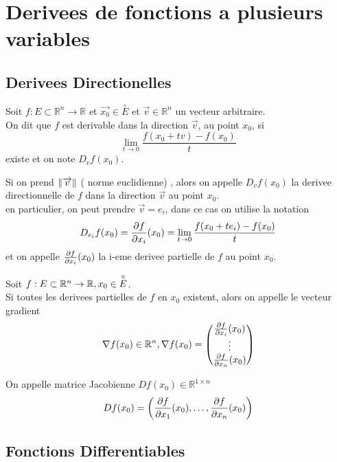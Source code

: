 \documentclass[../main.tex]{subfiles}
\begin{document}
\section{Derivees de fonctions a plusieurs variables}
\subsection{Derivees Directionelles}
\begin{defn}
	Soit $f:E\subset \mathbb{R}^n \to \mathbb{R}$ et $\vec{x_0} \in \overset{\circ}{E}$ et $\vec{v} \in \mathbb{R}^n$ un vecteur arbitraire.\\
	On dit que $f$ est derivable dans la direction $ \vec{v}$, au point $x_0$, si 
	 \[ 
		 \lim_{t \to 0} \frac{f( x_0 + tv) - f( x_0) }{t}
	\]
	existe et on note $ D_v f( x_0) $.
	
\end{defn}
Si on prend $\left\lVert \overrightarrow{v}\right\rVert$ ( norme euclidienne) , alors on appelle $D_vf( x_0) $ la derivee directionnelle de $f$ dans la direction $\vec{v}$ au point $x_0$.\\
en particulier, on peut prendre $\vec{v} = e_i$, dans ce cas on utilise la notation
\[ 
	D_{e_i} f( x_0) = \frac{\partial f}{\partial x_i}( x_0) = \lim_{t \to 0} \frac{f( x_0 + t e_i) - f( x_0)}{t} 
\]
et on appelle $\frac{\partial f}{\partial x_i}( x_0)$ la i-eme derivee partielle de $f$ au point $x_0$.
\begin{defn}[Gradient]
	Soit $f: E \subset \mathbb{R}^n\to \mathbb{R},  x_0 \in \overset{\circ}{E}$.\\
	Si toutes les derivees partielles de $f$ en $x_0$ existent, alors on appelle le vecteur gradient
	\[ 
		\nabla f( x_0) \in \mathbb{R}^n, \nabla f( x_0) = 
		\begin{pmatrix}
			\frac{\partial f}{\partial x_i}( x_0) \\
			\vdots\\
			\frac{\partial f}{\partial x_n}( x_0) 
		\end{pmatrix}
	\]
	
\end{defn}
\begin{defn}
	On appelle matrice Jacobienne $D f( x_0) \in \mathbb{R}^{1\times n}$
	\[ 
		D f( x_0) = \left( \frac{\partial f}{\partial x_1}( x_0) , \ldots, \frac{\partial f}{\partial x_n}( x_0)  \right) 
	\]
	

\end{defn}

\subsection{Fonctions Differentiables}
\end{document}
